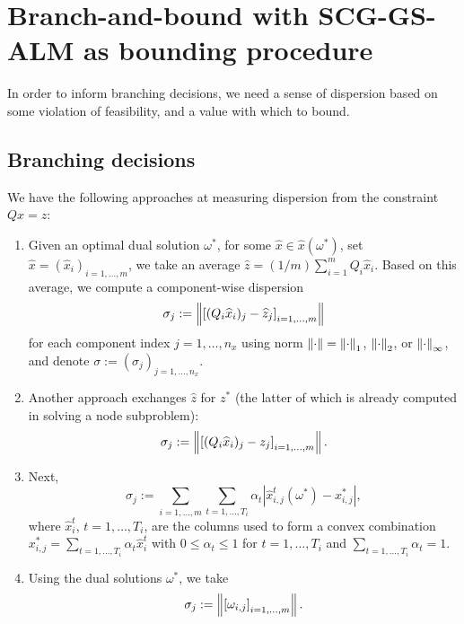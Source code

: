 \section{Branch-and-bound with SCG-GS-ALM as bounding procedure}

In order to inform branching decisions, we need a sense of dispersion based on some violation of feasibility, and a value with which to bound.

\subsection{Branching decisions}
We have the following approaches at measuring dispersion from the constraint $Qx=z$:
\begin{enumerate}
\item Given an optimal dual solution $\omega^*$, for some $\widehat{x} \in \widehat{x}(\omega^*)$, 
set $\widehat{x}=(\widehat{x}_i)_{i=1,\dots,m}$, we take an average $\widehat{z} = (1/m)\sum_{i=1}^m Q_i\widehat{x}_i$. Based on this average,
we compute a component-wise dispersion 
$$\sigma_j:=\left \|  \left[(Q_i\widehat{x}_{i})_j - \widehat{z}_j\right]_{i=1,\dots,m}  \right \|$$ 
for each component index $j=1,\dots,n_x$ using norm $\left \| \cdot \right \|=\left \| \cdot \right \|_{1}$, $\left \| \cdot \right \|_2$, or $\left \| \cdot \right \|_\infty$, and denote $\sigma:=(\sigma_j)_{j=1,\dots,n_x}$. 
\item Another approach exchanges $\widehat{z}$ for $z^*$ (the latter of which is already computed in solving a node subproblem):
$$\sigma_j:=\left \|  \left[(Q_i\widehat{x}_{i})_j - {z}_j\right]_{i=1,\dots,m}  \right \|.$$ 
\item Next,
$$ \sigma_j := \sum_{i=1,\dots,m} \sum_{t=1,\dots,T_i} \alpha_t \left| \widehat{x}_{i,j}^t(\omega^*) - x_{i,j}^* \right|, $$
where $\widehat{x}_{i}^t$, $t=1,\dots,T_i$, are the columns used to form a convex combination $x_{i,j}^* = \sum_{t=1,\dots,T_i} \alpha_t\widehat{x}_{i}^t$
with $0 \le \alpha_t \le 1$ for $t=1,\dots,T_i$ and $\sum_{t=1,\dots,T_i} \alpha_t = 1$.
\item Using the dual solutions $\omega^*$, we take
$$
\sigma_j := \left \| \left[\omega_{i,j}\right]_{i=1,\dots,m} \right \|.
$$
\end{enumerate}





